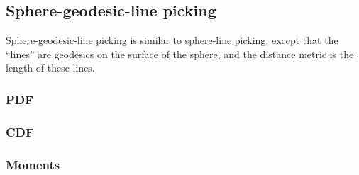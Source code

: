 \subsection{Sphere-geodesic-line picking}
\label{sec:sphere_geodesic_line}


Sphere-geodesic-line picking is similar to sphere-line picking, except
that the ``lines'' are geodesics on the surface of the sphere, and the
distance metric is the length of these lines.

\subsubsection{PDF}


\subsubsection{CDF}


\subsubsection{Moments}



